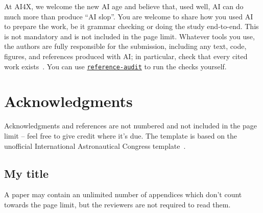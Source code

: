 \documentclass{ai4x}
\begin{document}
At AI4X, we welcome the new AI age and believe that, used well, AI can do much more than produce ``AI slop''. You are welcome to share how you used AI to prepare the work, be it grammar checking or doing the study end-to-end. This is not mandatory and is not included in the page limit. Whatever tools you use, the authors are fully responsible for the submission, including any text, code, figures, and references produced with AI; in particular, check that every cited work exists~\cite{ai4x2028hallucinated}. You can use \href{https://github.com/constructorfabric/reference-audit/}{\texttt{reference-audit}} to run the checks yourself.

\section*{Acknowledgments}
Acknowledgments and references are not numbered and not included in the page limit -- feel free to give credit where it's due. The template is based on the unofficial International Astronautical Congress template~\cite{iactemplate}.



\begin{appendices}
\section{My title}
A paper may contain an unlimited number of appendices which don't count towards the page limit, but the reviewers are not required to read them.
\end{appendices}
\end{document}
